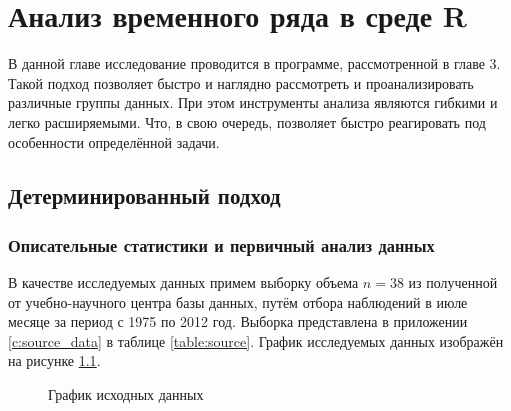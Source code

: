
\newcommand{\inp}[1]{}
\newcommand{\characteristic}[2]{\inp{#1/characteristics/#2}}
\newcommand{\descriptive}[2]{\inp{#1/descriptive/#2}}
\newcommand{\test}[3]{\inp{#1/test/#2/#3}}
\newcommand{\normaldistr}{$\mathcal{N}(\descriptive{original}{mean}, \descriptive{original}{variance})$}
\newcommand{\resnormaldistr}{$\mathcal{N}(\descriptive{residual}{mean}, \descriptive{residual}{variance})$}

\newpage

\chapter{Анализ временного ряда в среде R}

В данной главе исследование проводится в программе, рассмотренной в главе 3. Такой подход позволяет быстро и наглядно рассмотреть и проанализировать различные группы данных. При этом инструменты анализа являются гибкими и легко расширяемыми. Что, в свою очередь, позволяет быстро реагировать под особенности определённой задачи.

\section{Детерминированный подход} %
\label{sec:determenistic}

\subsection{Описательные статистики и первичный анализ данных} %
\label{sec:basis}

В качестве исследуемых данных примем выборку объема $ n = 38 $ из полученной от учебно-научного центра базы данных, путём отбора наблюдений в июле месяце за период с 1975 по 2012 год. Выборка представлена в приложении \ref{c:source_data} в таблице \ref{table:source}. График исследуемых данных изображён на рисунке \ref{img:input}.
\begin{figure}[ht]
\caption{График исходных данных}
\label{img:input}
\end{figure}

